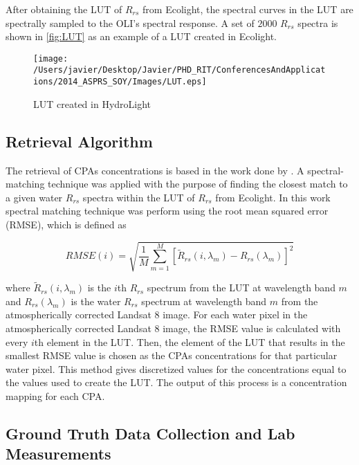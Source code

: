 \documentclass[onecolumn,3p]{elsarticle}
\begin{document}
After obtaining the LUT of $R_{rs}$ from Ecolight, the spectral curves in the LUT are spectrally sampled to the OLI's spectral response. A set of $2000$ $R_{rs}$ spectra is shown in { \autoref{fig:LUT}} as an example of a LUT created in Ecolight.

\begin{figure}[htb]
    \centering
      \texttt{[image: /Users/javier/Desktop/Javier/PHD\_RIT/ConferencesAndApplications/2014\_ASPRS\_SOY/Images/LUT.eps]}
      \caption{LUT created in HydroLight}
      \label{fig:LUT}
\end{figure}

\subsection{Retrieval Algorithm} 
\label{subsec:Retrieval}
The retrieval of CPAs concentrations is based in the work done by \cite*{Gerace:2013}. A spectral-matching technique was applied with the purpose of finding the closest match to a given water $R_{rs}$ spectra within the LUT of $R_{rs}$ from Ecolight. In this work spectral matching technique was perform using the root mean squared error (RMSE), which is defined as

\begin{equation}
  RMSE(i) = \sqrt{\frac{1}{M}\sum_{m=1}^M\left[\widetilde{R}_{rs}(i,\lambda_m)-R_{rs}(\lambda_m)\right]^2}
\end{equation}

\noindent where $\widetilde{R}_{rs}(i,\lambda_m)$ is the $i$th $R_{rs}$ spectrum from the LUT at wavelength band $m$ and $R_{rs}(\lambda_m)$ is the water $R_{rs}$ spectrum at wavelength band $m$ from the atmospherically corrected Landsat 8 image. For each water pixel in the atmospherically corrected Landsat 8 image, the RMSE value is calculated with every $i$th element in the LUT. Then, the element of the LUT that results in the smallest RMSE value is chosen as the CPAs concentrations for that particular water pixel. This method gives discretized values for the concentrations equal to the values used to create the LUT. The output of this process is a concentration mapping for each CPA.
\subsection{Ground Truth Data Collection and Lab Measurements}
\label{subsec:FieldLabMea}
\end{document}

